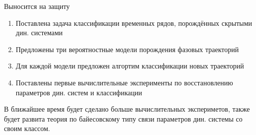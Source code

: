 \documentclass[10pt]{beamer}
\theoremstyle{definition}
\begin{document}
	\begin{frame}{Выносится на защиту}
		
		\begin{enumerate}
			\item Поставлена задача классификации временных рядов, порождённых скрытыми дин. системами
			\item Предложены три вероятностные модели порождения фазовых траекторий
			\item Для каждой модели предложен алгортим классификации новых траекторий
			\item Поставлены первые вычислительные эксперименты по восстановлению параметров дин. систем и классификации 
		\end{enumerate}
		
		В ближайшее время будет сделано больше вычислительных экспериметов, также будет развита теория по байесовскому типу связи параметров дин. системы со своим классом.
		
	\end{frame}	
	
\end{document}
